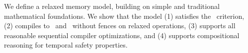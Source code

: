 We define a relaxed memory model, building on simple and traditional mathematical foundations.  We show that the model (1) satisfies the \drfsc\ criterion, (2)
compiles to \tso\ and \armeight\ without fences on relaxed operations, (3)
supports all reasonable sequential compiler optimizations, and (4) supports compositional reasoning for temporal safety properties.
